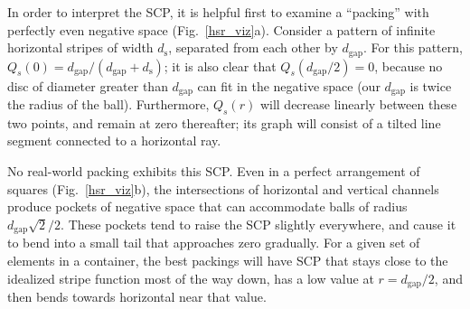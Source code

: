 In order to interpret the SCP, it is helpful first to
examine a ``packing'' with perfectly even negative space (Fig.~\ref{hsr_viz}a).
Consider a pattern of infinite horizontal stripes of width $d_\mathrm{s}$,
separated from each other by $d_\mathrm{gap}$.  For this pattern,
$Q_s(0)=d_\mathrm{gap}/(d_\mathrm{gap}+d_\mathrm{s})$; it is also
clear that $Q_s(d_\mathrm{gap}/2)=0$, because no disc of diameter greater
than $d_\mathrm{gap}$ can fit in the negative space
(our $d_\mathrm{gap}$ is twice the radius of the ball).
Furthermore,
$Q_s(r)$ will decrease linearly between these two points, and remain
at zero thereafter; its graph will consist of a tilted line segment
connected to a horizontal ray.



No real-world packing exhibits this SCP.  Even in a perfect arrangement
of squares (Fig.~\ref{hsr_viz}b), the intersections of horizontal and
vertical channels
produce pockets of negative space that can accommodate balls of
radius $d_\mathrm{gap}\sqrt{2}/2$.  These pockets tend to raise the SCP
slightly everywhere, and cause it to bend into a small tail that
approaches zero gradually.
For a given set of elements in a container, the best packings will
have  SCP that stays close to the idealized stripe function most
of the way down, has a low value at $r=d_\mathrm{gap}/2$,
and then bends towards horizontal near that value.



